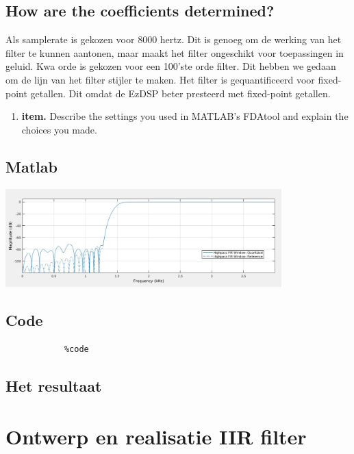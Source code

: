 \documentclass[11pt,a4paper]{article}
\newcommand\litem[1]{\item{\bfseries#1.\space}}
\begin{document}
	\subsection{How are the coefficients determined?}
	Als samplerate is gekozen voor 8000 hertz. Dit is genoeg om de werking van het filter te kunnen aantonen, maar maakt het filter ongeschikt voor toepassingen in geluid. 
	Kwa orde is gekozen voor een 100'ste orde filter. Dit hebben we gedaan om de lijn van het filter stijler te maken.
	Het filter is gequantificeerd voor fixed-point getallen. Dit omdat de EzDSP beter presteerd met fixed-point getallen.

	
		\begin{enumerate}[label=\emph{\alph*)}]
			\litem{item} Describe the settings you 					used in MATLAB’s FDAtool and explain the 					choices you made.
		\end{enumerate}
	

		\subsection{Matlab}
		
		\includegraphics[width=0.80\textwidth]{firMatlab}\par\vspace{1cm}
		
		\subsection{Code}

		\begin{lstlisting}
			%code
		\end{lstlisting}
		
		\subsection{Het resultaat}

	
	\section{Ontwerp en realisatie IIR filter}
		
\end{document}
